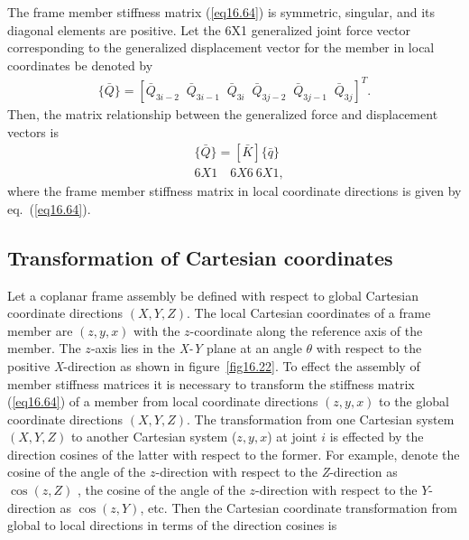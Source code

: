 \documentclass{AeroStructure-ERJohnson}
\begin{document}
The frame member stiffness matrix (\ref{eq16.64}) is symmetric, singular, and its diagonal elements are positive. Let the 6X1 generalized joint force vector corresponding to the generalized displacement vector for the member in local coordinates be denoted by
\begin{align}\label{eq16.65}
\{\bar{Q}\}=\left[\bar{Q}_{3 i-2}\;\; \bar{Q}_{3 i-1}\;\; \bar{Q}_{3 i}\;\; \bar{Q}_{3 j-2}\;\; \bar{Q}_{3 j-1}\;\; \bar{Q}_{3j}\right]^{T}.
\end{align}
Then, the matrix relationship between the generalized force and displacement vectors is
\begin{equation}\label{eq16.66}
\begin{aligned}&\{\bar{Q}\}=[\bar{K}]\{\bar{q}\} \\&6 X 1 \quad 6 X 6\ 6 X 1,\end{aligned}
\end{equation}
where the frame member stiffness matrix in local coordinate directions is given by eq.~(\ref{eq16.64}).

\subsection{Transformation of Cartesian coordinates}\label{sec16.3.1}

Let a coplanar frame assembly be defined with respect to global Cartesian coordinate directions $(X,Y,Z)$. The local Cartesian coordinates of a frame member are $(z, y, x)$ with the $z$-coordinate along the reference axis of the member. The $z$-axis lies in the \textit{X-Y} plane at an angle $\theta$ with respect to the positive \textit{X}-direction as shown in figure~\ref{fig16.22}. To effect the assembly of member stiffness matrices it is necessary to transform the stiffness matrix (\ref{eq16.64}) of a member from local coordinate directions $(z, y, x)$ to the global coordinate directions $(X,Y,Z)$. The transformation from one Cartesian system $(X,Y,Z)$ to another Cartesian system ($z,y,x$) at joint $i$ is effected by the direction cosines of the latter with respect to the former. For example, denote the cosine of the angle of the $z$-direction with respect to the \textit{Z}-direction as $\cos (z, Z)$ , the cosine of the angle of the $z$-direction with respect to the $Y$-direction as $\cos (z, Y)$, etc. Then the Cartesian coordinate transformation from global to local directions in terms of the direction cosines is

\end{document}
